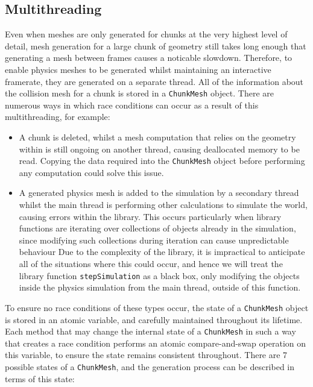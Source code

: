 \documentclass{article}
\begin{document}
\subsection{Multithreading}
Even when meshes are only generated for chunks at the very highest level of detail, mesh generation for a large chunk of geometry still takes long enough that generating a mesh between frames causes a noticable slowdown. Therefore, to enable physics meshes to be generated whilst maintaining an interactive framerate, they are generated on a separate thread. All of the information about the collision mesh for a chunk is stored in a \texttt{ChunkMesh} object. There are numerous ways in which race conditions can occur as a result of this multithreading, for example:
\begin{itemize}
  \item A chunk is deleted, whilst a mesh computation that relies on the geometry within is still ongoing on another thread, causing deallocated memory to be read. Copying the data required into the \texttt{ChunkMesh} object before performing any computation could solve this issue.
  \item A generated physics mesh is added to the simulation by a secondary thread whilst the main thread is performing other calculations to simulate the world, causing errors within the library. This occurs particularly when library functions are iterating over collections of objects already in the simulation, since modifying such collections during iteration can cause unpredictable behaviour Due to the complexity of the library, it is impractical to anticipate all of the situations where this could occur, and hence we will treat the library function \texttt{stepSimulation} as a black box, only modifying the objects inside the physics simulation from the main thread, outside of this function.
\end{itemize}
To ensure no race conditions of these types occur, the state of a \texttt{ChunkMesh} object is stored in an atomic variable, and carefully maintained throughout its lifetime. Each method that may change the internal state of a \texttt{ChunkMesh} in such a way that creates a race condition performs an atomic compare-and-swap operation on this variable, to ensure the state remains consistent throughout. There are 7 possible states of a \texttt{ChunkMesh}, and the generation process can be described in terms of this state:
\end{document}
